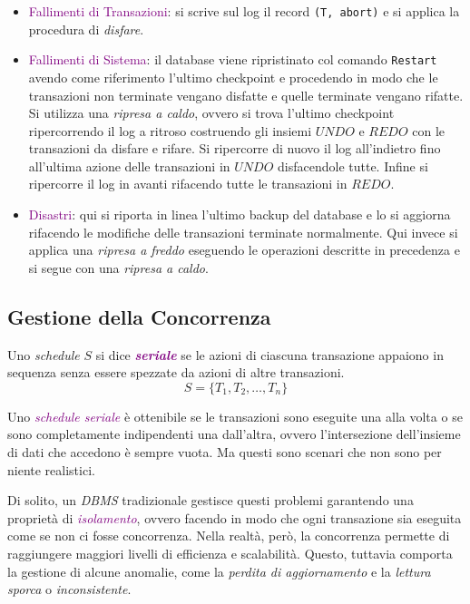 \begin{itemize}
    \item \textcolor{purple}{Fallimenti di Transazioni}: si scrive sul log il
        record \verb|(T, abort)| e si applica la procedura di \emph{disfare}.
    \item \textcolor{purple}{Fallimenti di Sistema}: il database viene ripristinato col comando
        \verb|Restart| avendo come riferimento l'ultimo checkpoint e procedendo in modo
        che le transazioni non terminate vengano disfatte e quelle terminate vengano rifatte.
        Si utilizza una \emph{ripresa a caldo}, ovvero si trova l'ultimo checkpoint ripercorrendo
        il log a ritroso costruendo gli insiemi $UNDO$ e $REDO$ con le transazioni da disfare e rifare.
        Si ripercorre di nuovo il log all'indietro fino all'ultima azione delle transazioni
        in $UNDO$ disfacendole tutte. Infine si ripercorre il log in avanti rifacendo tutte le transazioni
        in $REDO$.
    \item \textcolor{purple}{Disastri}: qui si riporta in linea l'ultimo backup del database e lo
        si aggiorna rifacendo le modifiche delle transazioni terminate normalmente.
        Qui invece si applica una \emph{ripresa a freddo} eseguendo le operazioni descritte in precedenza
        e si segue con una \emph{ripresa a caldo}.
\end{itemize}

\subsection{Gestione della Concorrenza}

Uno \emph{schedule} $S$ si dice \textbf{\emph{\textcolor{purple}{seriale}}} se le azioni
di ciascuna transazione appaiono in sequenza senza essere spezzate da azioni di altre transazioni.
\begin{equation*}
    S = \{T_1, T_2, \dots, T_n\}
\end{equation*}

Uno \emph{\textcolor{purple}{schedule seriale}} è ottenibile se le transazioni sono eseguite una alla volta
o se sono completamente indipendenti una dall'altra, ovvero l'intersezione dell'insieme di dati che accedono è
sempre vuota. Ma questi sono scenari che non sono per niente realistici.

Di solito, un \emph{DBMS} tradizionale gestisce questi problemi garantendo una proprietà
di \emph{\textcolor{purple}{isolamento}}, ovvero facendo in modo che ogni transazione sia eseguita
come se non ci fosse concorrenza. Nella realtà, però, la concorrenza permette di raggiungere
maggiori livelli di efficienza e scalabilità. Questo, tuttavia comporta la gestione di
alcune anomalie, come la \emph{perdita di aggiornamento} e la \emph{lettura sporca} o \emph{inconsistente}.

